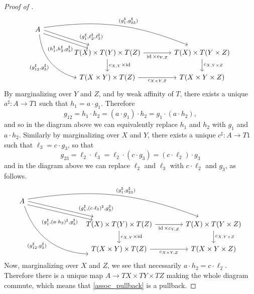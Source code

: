 \documentclass[a4paper,UKenglish,numberwithinsect,cleveref, autoref, thm-restate]{lipics-v2021}
\theoremstyle{plain} %
\theoremstyle{definition} %
\begin{document}
\begin{proof}[Proof of ]
\[
  \begin{tikzcd}[column sep=3.3pc]
   A \ar[bend left=15, shift left]{drr}{(g_1^\sharp,g_{23}^\sharp)} \ar[bend right=35]{ddr}[swap]{(g_{12}^\sharp,g_3^\sharp)} 
    \ar[shift left]{dr}[near end]{(g_1^\sharp,\ell_2^\sharp,\ell_3^\sharp)} \ar[shift right]{dr}[swap, pos=0.7]{(h_1^\sharp,h_2^\sharp, g_3^\sharp)} \\
   & T(X) \times T(Y) \times T(Z) \ar{r}[swap]{\id \times c_{Y,Z}} \ar{d}{c_{X,Y} \times \id}	& T(X) \times T(Y \times Z) \ar{d}{c_{X,Y \times Z}}	\\
   & T(X \times Y) \times T(Z) \ar{r}[swap]{c_{X\times Y,Z}}						& T(X \times Y \times Z)
  \end{tikzcd}
 \]
 By marginalizing over $Y$ and $Z$, and by weak affinity of $T$, there exists a unique $a^\sharp:A\to T1$ such that $h_1 = a\cdot g_1$. 
 Therefore
 \[
  g_{12} = h_1\cdot h_2 = (a\cdot g_1) \cdot h_2 = g_1\cdot (a\cdot h_2) ,
 \]
 and so in the diagram above we can equivalently replace $h_1$ and $h_2$ with $g_1$ and $a\cdot h_2$.
 Similarly by marginalizing over $X$ and $Y$, there exists a unique $c^\sharp:A\to T1$ such that $\ell_3=c\cdot g_3$, so that
 \[
  g_{23}= \ell_2\cdot\ell_3 = \ell_2\cdot (c\cdot g_3) = (c\cdot \ell_2) \cdot g_3
 \]
 and in the diagram above we can replace $\ell_2$ and $\ell_3$ with $c\cdot \ell_2$ and $g_3$, as follows.
 \[
  \begin{tikzcd}[column sep=3.3pc]
   A \ar[bend left=15, shift left]{drrr}{(g_1^\sharp,g_{23}^\sharp)} \ar[bend right=35]{ddrr}[swap]{(g_{12}^\sharp,g_3^\sharp)} 
    \ar[shift left]{drr}[near end]{(g_1^\sharp,(c\cdot\ell_2)^\sharp,g_3^\sharp)} \ar[shift right]{drr}[swap, pos=0.8]{(g_1^\sharp,(a\cdot h_2)^\sharp, g_3^\sharp)} \\
   && T(X) \times T(Y) \times T(Z) \ar{r}[swap]{\id \times c_{Y,Z}} \ar{d}{c_{X,Y} \times \id}	& T(X) \times T(Y \times Z) \ar{d}{c_{X,Y \times Z}}	\\
   && T(X \times Y) \times T(Z) \ar{r}[swap]{c_{X\times Y,Z}}						& T(X \times Y \times Z)
  \end{tikzcd}
 \]
 Now, marginalizing over $X$ and $Z$, we see that necessarily $a\cdot h_2=c\cdot \ell_2$. 
 Therefore there is a unique map $A\to TX\times TY\times TZ$ making the whole diagram commute, which means that \eqref{assoc_pullback} is a pullback.
 

\end{proof}
\end{document}

